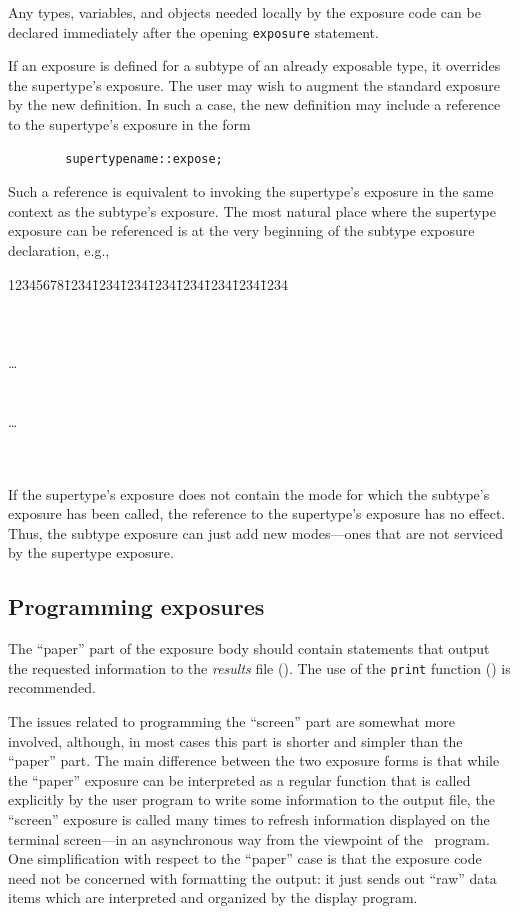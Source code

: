 Any types, variables, and objects needed locally by the exposure code
can be declared immediately after the opening {\tt exposure} statement.

If an exposure is defined for a subtype of an already exposable type, it
overrides the supertype's exposure.
The user may wish to augment the standard exposure by the new definition.
In such a case, the new definition may include a reference to the
supertype's exposure in the form
\begin{verbatim}
        supertypename::expose;
\end{verbatim}
Such a reference is equivalent to invoking the supertype's exposure in the
same context as the subtype's exposure.
The most natural place where the supertype exposure can be referenced is
at the very beginning of the subtype exposure declaration, e.g.,
{\tt\begin{tabbing}
12345678\=1234\=1234\=1234\=1234\=1234\=1234\=1234\=1234\kill
{} \\
\>  \\
\>  \\
\>  \\
\> \> \>\ldots \\
\> \>{\tt \};} \\
\>  \\
\> \> \>\ldots \\
\> \>{\tt \};} \\
\>{\tt \};} \\
\end{tabbing}}
If the supertype's exposure does not contain the mode for which the
subtype's exposure has been called, the reference to the supertype's exposure
has no effect.
Thus, the subtype exposure can just add new modes---ones that are not serviced
by the supertype exposure.

\subsection{Programming exposures}
\label{rm_ex_pr}

The ``paper'' part of the exposure body should contain statements that output
the requested information to the {\em results\/} file ().
The use of the {\tt print} function () is recommended.

The issues related to programming the ``screen'' part are somewhat more
involved, although, in most cases this part is shorter and simpler than the
``paper'' part.
The main difference between the two exposure forms is that while the
``paper'' exposure can be interpreted as a regular function that is called
explicitly by the user program to write some information to the
output file, the ``screen'' exposure is called many times to refresh
information displayed on the terminal screen---in an asynchronous way from the
viewpoint of the \smurph\ program.
One simplification with respect to the ``paper'' case is that the exposure
code need not be concerned with formatting the output: it just sends out
``raw'' data items which are interpreted and organized by the display
program.

